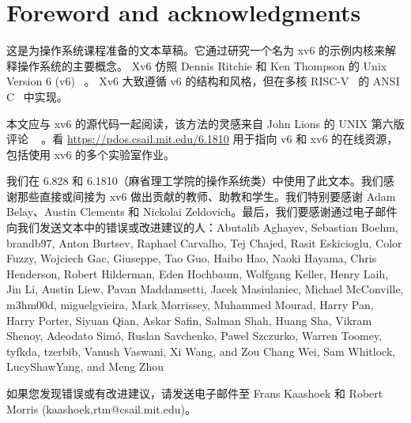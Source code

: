 

\chapter*{Foreword and acknowledgments}     

这是为操作系统课程准备的文本草稿。它通过研究一个名为 xv6 的示例内核来解释操作系统的主要概念。 Xv6 仿照 Dennis Ritchie 和 Ken Thompson 的 Unix Version 6 (v6)~    \cite{unix}    。 Xv6 大致遵循 v6 的结构和风格，但在多核 RISC-V~    \cite{riscv}    的 ANSI C~    \cite{kernighan}    中实现。  

本文应与 xv6 的源代码一起阅读，该方法的灵感来自 John Lions 的 UNIX 第六版评论 ~    \cite{lions}    。看
    \url{https://pdos.csail.mit.edu/6.1810}    用于指向 v6 和 xv6 的在线资源，包括使用 xv6 的多个实验室作业。  

我们在 6.828 和 6.1810（麻省理工学院的操作系统类）中使用了此文本。我们感谢那些直接或间接为 xv6 做出贡献的教师、助教和学生。我们特别要感谢 Adam Belay、Austin Clements 和 Nickolai Zeldovich。最后，我们要感谢通过电子邮件向我们发送文本中的错误或改进建议的人：Abutalib Aghayev, Sebastian Boehm, brandb97, Anton
Burtsev, Raphael Carvalho, Tej Chajed, Rasit Eskicioglu, Color Fuzzy,
Wojciech Gac, Giuseppe, Tao Guo, Haibo Hao, Naoki Hayama, Chris
Henderson, Robert Hilderman, Eden Hochbaum, Wolfgang Keller, Henry
Laih, Jin Li, Austin Liew, Pavan Maddamsetti, Jacek Masiulaniec,
Michael McConville, m3hm00d, miguelgvieira, Mark Morrissey, Muhammed
Mourad, Harry Pan, Harry Porter, Siyuan Qian, Askar Safin, Salman
Shah, Huang Sha, Vikram Shenoy,  Adeodato Simó, Ruslan Savchenko, Pawel Szczurko,
Warren Toomey, tyfkda, tzerbib, Vanush Vaswani, Xi Wang, and Zou Chang
Wei, Sam Whitlock, LucyShawYang, and Meng Zhou  

如果您发现错误或有改进建议，请发送电子邮件至 Frans Kaashoek 和 Robert Morris (kaashoek,rtm@csail.mit.edu)。  


